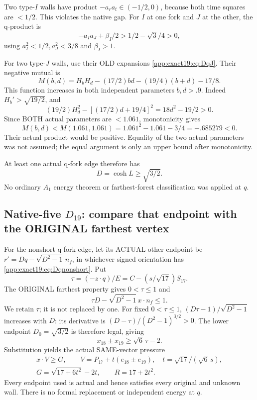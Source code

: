 \documentclass[11pt]{article}
\theoremstyle{definition}
\theoremstyle{remark}
\begin{document}
Two type-\(I\) walls have product
\(-a_ra_t\in(-1/2,0)\), because
both time squares are \(<1/2\).
This violates the native gap.
For \(I\) at one fork and \(J\)
at the other, the q-product is
\[
             -a_Ia_J+\beta_I/2
                     >1/2-\sqrt3/4>0 ,
\]
using \(a_I^2<1/2,a_J^2<3/8\)
and \(\beta_I>1\).

For two type-\(J\) walls, use
their OLD expansions
\eqref{app:exact19:eq:DqJ}.
Their negative mutual is
\[
 M(b,d)=H_bH_d-(17/2)bd-(19/4)(b+d)-17/8 .
\]
This function increases in both
independent parameters \(b,d>.9\).
Indeed \(H_b'>\sqrt{19/2}\), and
\[
                 (19/2)H_d^2-[(17/2)d+19/4]^2
                                      =18d^2-19/2>0 .
\]
Since BOTH actual parameters are
\(<1.061\), monotonicity gives
\[
 M(b,d)<M(1.061,1.061)
           =1.061^2-1.061-3/4=-.685279<0 .
\]
Their actual product would be
positive.
Equality of the two actual
parameters was not assumed;
the equal argument is only an
upper bound after monotonicity.

At least one actual q-fork edge
therefore has
\[
                              D=\cosh L\ge\sqrt{3/2}.
\tag{D19qnonshort}\label{app:exact19:eq:Dqnonshort}
\]
No ordinary \(A_1\) energy theorem
or farthest-forest classification
was applied at \(q\).

\subsection[Native-five D19: compare that endpoint with the ORIGINAL farthest vertex]{Native-five \(D_{19}\): compare that endpoint with the ORIGINAL farthest vertex}
\label{app:exact19:Dfiveqfinish}

For the nonshort q-fork edge,
let its ACTUAL other endpoint be
\(r'=Dq-\sqrt{D^2-1}\,n_f\),
in whichever signed orientation
has
\eqref{app:exact19:eq:Dqnonshort}.
Put
\[
                \tau=(-z\cdot q)/E
                        =C-(s/\sqrt{17})S_{17}.
\]
The ORIGINAL farthest property
gives \(0<\tau\le1\) and
\[
                       \tau D-\sqrt{D^2-1}\,x\cdot n_f\le1 .
\]
We retain \(\tau\); it is not
replaced by one.
For fixed \(0<\tau\le1\),
\((D\tau-1)/\sqrt{D^2-1}\)
increases with \(D\):
its derivative is
\((D-\tau)/(D^2-1)^{3/2}>0\).
The lower endpoint
\(D_0=\sqrt{3/2}\) is therefore
legal, giving
\[
                               x_{18}\pm x_{19}\ge\sqrt6\,\tau-2 .
\]
Substitution yields the actual
SAME-vector pressure
\[
\begin{gathered}
 x\cdot V\ge G,\qquad
 V=P_{17}+t(e_{18}\pm e_{19}),\quad
 t=\sqrt{17}/(\sqrt6\,s),\\
                   G=\sqrt{17+6t^2}-2t,\qquad R=17+2t^2 .
\end{gathered}
\]
Every endpoint used is actual
and hence satisfies every
original and unknown wall.
There is no formal replacement
or independent energy at \(q\).
\end{document}
